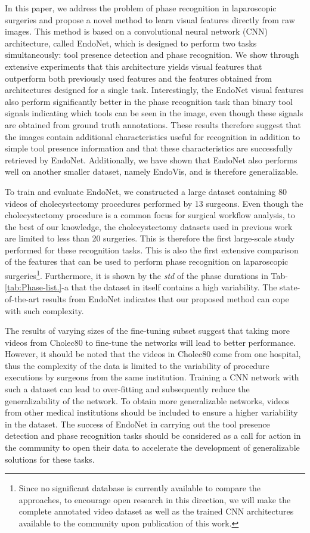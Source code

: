 \documentclass[journal]{IEEEtran} \usepackage{amssymb}
\begin{document}
In this paper, we address the problem of phase recognition in laparoscopic surgeries and propose a novel method to learn visual features directly from raw images.
This method is based on a convolutional neural network (CNN) architecture, called EndoNet, which is designed to perform two tasks simultaneously: tool presence detection and phase recognition. 
We show through extensive experiments that this architecture yields visual features that outperform both previously used features and the features obtained from architectures designed for a single task.
Interestingly, the EndoNet visual features also perform significantly better in the phase recognition task than binary tool signals indicating which tools can be seen in the image, even though these signals are obtained from ground truth annotations. These results therefore suggest that the images contain additional characteristics useful for recognition in addition to simple tool presence information and that these characteristics are successfully retrieved by EndoNet.
Additionally, we have shown that EndoNet also performs well on another smaller dataset, namely EndoVis, and is therefore generalizable.

To train and evaluate EndoNet, we constructed a large dataset containing 80 videos of cholecystectomy procedures performed by 13 surgeons. Even though the cholecystectomy procedure is a common focus for surgical workflow analysis, to the best of our knowledge, the cholecystectomy datasets used in previous work are limited to less than 20 surgeries. This is therefore the first large-scale study performed for these recognition tasks. This is also the first extensive comparison of the features that can be used to perform phase recognition on laparoscopic surgeries\footnote{Since no significant database is currently available to compare the approaches, to encourage open research in this direction, we will make the complete annotated video dataset as well as the trained CNN architectures available to the community upon publication of this work.}. Furthermore, it is shown by the \textit{std} of the phase durations in Tab-\ref{tab:Phase-list.}-a that the dataset in itself contains a high variability. The state-of-the-art results from EndoNet indicates that our proposed method can cope with such complexity. 

The results of varying sizes of the fine-tuning subset suggest that taking more videos from Cholec80 to fine-tune the networks will lead to better performance. However, it should be noted that the videos in Cholec80 come from one hospital, thus the complexity of the data is limited to the variability of procedure executions by surgeons from the same institution. Training a CNN network with such a dataset can lead to over-fitting and subsequently reduce the generalizability of the network. To obtain more generalizable networks, videos from other medical institutions should be included to ensure a higher variability in the dataset. The success of EndoNet in carrying out the tool presence detection and phase recognition tasks should be considered as a call for action in the community to open their data to accelerate the development of generalizable solutions for these tasks. 
\end{document}
